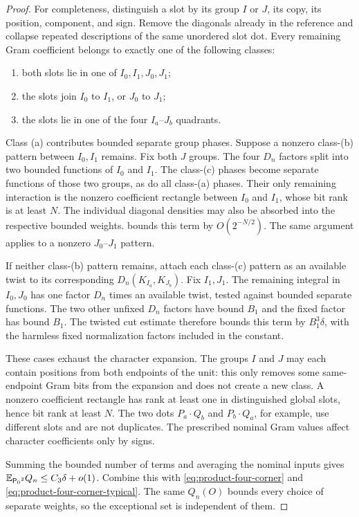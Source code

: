 \begin{proof}
For completeness, distinguish a slot by its group $I$ or $J$, its
copy, its position, component, and sign. Remove the diagonals already
in the reference and collapse repeated descriptions of the same
unordered slot dot. Every remaining Gram coefficient belongs to
exactly one of the following classes:
\begin{enumerate}[label=(\alph*)]
\item both slots lie in one of $I_0,I_1,J_0,J_1$;
\item the slots join $I_0$ to $I_1$, or $J_0$ to $J_1$;
\item the slots lie in one of the four $I_a$--$J_b$ quadrants.
\end{enumerate}
Class (a) contributes bounded separate group phases. Suppose a
nonzero class-(b) pattern between $I_0,I_1$ remains. Fix both $J$
groups. The four $D_n$ factors split into two bounded functions of
$I_0$ and $I_1$. The class-(c) phases become separate functions of
those two groups, as do all class-(a) phases. Their only remaining
interaction is the nonzero coefficient rectangle between $I_0$ and
$I_1$, whose bit rank is at least $N$. The individual diagonal
densities may also be absorbed into the respective bounded weights.
 bounds this term by $O(2^{-N/2})$. The same argument
applies to a nonzero $J_0$--$J_1$ pattern.

If neither class-(b) pattern remains, attach each class-(c) pattern
as an available twist to its corresponding $D_n(K_{I_a},K_{J_b})$.
Fix $I_1,J_1$. The remaining integral in $I_0,J_0$ has one factor
$D_n$ times an available twist, tested against bounded separate
functions. The two other unfixed $D_n$ factors have bound $B_1$ and
the fixed factor has bound $B_1$. The twisted cut estimate therefore
bounds this term by $B_1^3\delta$, with the harmless fixed
normalization factors included in the constant.

These cases exhaust the character expansion. The groups $I$ and $J$
may each contain positions from both endpoints of the unit: this only removes some
same-endpoint Gram bits from the expansion and does not create a new
class. A nonzero coefficient rectangle has rank at least one in
distinguished global slots, hence bit rank at least $N$.
The two dots $P_a\cdot Q_b$ and $P_b\cdot Q_a$, for example, use
different slots and are not duplicates. The prescribed nominal Gram
values affect character coefficients only by signs.

Summing the bounded number of terms and averaging the nominal inputs
gives $\mathbb E_{{\mathsf P_0}^2}Q_n\le C_3\delta+o(1)$. Combine this with
\eqref{eq:product-four-corner} and
\eqref{eq:product-four-corner-typical}. The same $Q_n(O)$ bounds every
choice of separate weights, so the exceptional set is independent of
them.
\end{proof}


